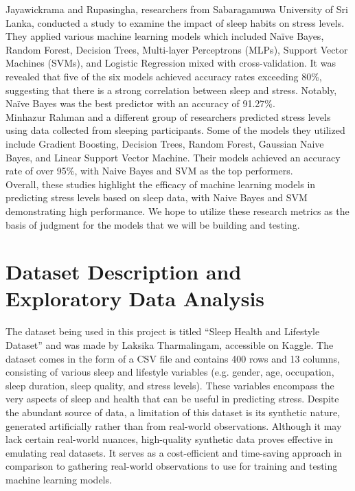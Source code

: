 \documentclass[11pt, letterpaper]{article}
\begin{document}
    \noindent Jayawickrama and Rupasingha, researchers from Sabaragamuwa University of Sri Lanka, conducted a study to examine the impact of sleep habits on stress levels.\cite{bib:2} They applied various machine learning models which included Naïve Bayes, Random Forest, Decision Trees, Multi-layer Perceptrons (MLPs), Support Vector Machines (SVMs), and Logistic Regression mixed with cross-validation. It was revealed that five of the six models achieved accuracy rates exceeding 80\%, suggesting that there is a strong correlation between sleep and stress. Notably, Naïve Bayes was the best predictor with an accuracy of 91.27\%.\\ 
    
    \noindent Minhazur Rahman and a different group of researchers predicted stress levels using data collected from sleeping participants.\cite{bib:1} Some of the models they utilized include Gradient Boosting, Decision Trees, Random Forest, Gaussian Naive Bayes, and Linear Support Vector Machine. Their models achieved an accuracy rate of over 95\%, with Naive Bayes and SVM as the top performers.\\
    
    \noindent Overall, these studies highlight the efficacy of machine learning models in predicting stress levels based on sleep data, with Naive Bayes and SVM demonstrating high performance. We hope to utilize these research metrics as the basis of judgment for the models that we will be building and testing.


    \section*{Dataset Description and Exploratory Data Analysis}
    \noindent The dataset being used in this project is titled “Sleep Health and Lifestyle Dataset”\cite{bib:3} and was made by Laksika Tharmalingam, accessible on Kaggle. The dataset comes in the form of a CSV file and contains 400 rows and 13 columns, consisting of various sleep and lifestyle variables (e.g. gender, age, occupation, sleep duration, sleep quality, and stress levels). These variables encompass the very aspects of sleep and health that can be useful in predicting stress. Despite the abundant source of data, a limitation of this dataset is its synthetic nature, generated artificially rather than from real-world observations. Although it may lack certain real-world nuances, high-quality synthetic data proves effective in emulating real datasets. It serves as a cost-efficient and time-saving approach in comparison to gathering real-world observations to use for training and testing machine learning models.\\
    
\end{document}
